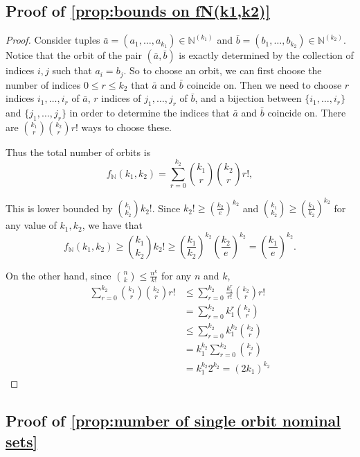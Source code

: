 \documentclass[11pt,a4paper]{amsart}
\theoremstyle{definition}
\newcommand{\bb}{\mathbb}
\begin{document}
\subsection{Proof of \autoref{prop:bounds on fN(k1,k2)}} \label{appendix:proof of bounds on fN(k1,k2)}

\begin{proof}
    Consider tuples $\bar a = (a_1, \ldots, a_{k_1}) \in \bb N^{(k_1)}$ and $\bar b = (b_1, \ldots, b_{k_2}) \in \bb N^{(k_2)}$. 
    Notice that the orbit of the pair $(\bar a, \bar b)$ is exactly determined by the collection of indices $i,j$ such that $a_i = b_j$.
    So to choose an orbit, we can first choose the number of indices $0 \leq r \leq k_2$ that $\bar a$ and $\bar b$ coincide on.
    Then we need to choose $r$ indices $i_1, \ldots, i_r$ of $\bar a$, $r$ indices of $j_1, \ldots, j_r$ of $\bar b$, and a bijection between $\{i_1, \ldots, i_r\}$ and $\{j_1, \ldots, j_r\}$ in order to determine the indices that $\bar a$ and $\bar b$ coincide on. 
    There are $\binom{k_1}{r}\binom{k_2}{r}r!$ ways to choose these. 
    
    Thus the total number of orbits is 
    \[
    f_{\bb N}(k_1, k_2) = \sum_{r=0}^{k_2} \binom{k_1}{r}\binom{k_2}{r}r!,
    \]

    This is lower bounded by $\binom{k_1}{k_2} k_2!$.
    Since $k_2! \geq \left(\frac{k_2}{e}\right)^{k_2}$ and $\binom{k_1}{k_2} \geq \left(\frac{k_1}{k_2}\right)^{k_2}$ for any value of $k_1, k_2$, we have that
    \[
        f_{\bb N}(k_1, k_2) \geq \binom{k_1}{k_2} k_2! \geq \left(\frac{k_1}{k_2}\right)^{k_2} \left(\frac{k_2}{e}\right)^{k_2} = \left(\frac{k_1}{e}\right)^{k_2}.
    \]

    On the other hand, since $\binom{n}{k} \leq \frac{n^k}{k!}$ for any $n$ and $k$,
    \begin{align*}
        \sum_{r=0}^{k_2} \binom{k_1}{r}\binom{k_2}{r}r! &\leq \sum_{r=0}^{k_2} \frac{k_1^r}{r!} \binom{k_2}{r} r! \\
        &= \sum_{r=0}^{k_2} k_1^r \binom{k_2}{r} \\
        &\leq \sum_{r=0}^{k_2} k_1^{k_2} \binom{k_2}{r} \\
        &= k_1^{k_2} \sum_{r=0}^{k_2} \binom{k_2}{r} \\
        &= k_1^{k_2} 2^{k_2} = (2k_1)^{k_2}
    \end{align*}
\end{proof}



\subsection{Proof of \autoref{prop:number of single orbit nominal sets}} \label{appendix:proof of number of single orbit nominal sets}
\end{document}
